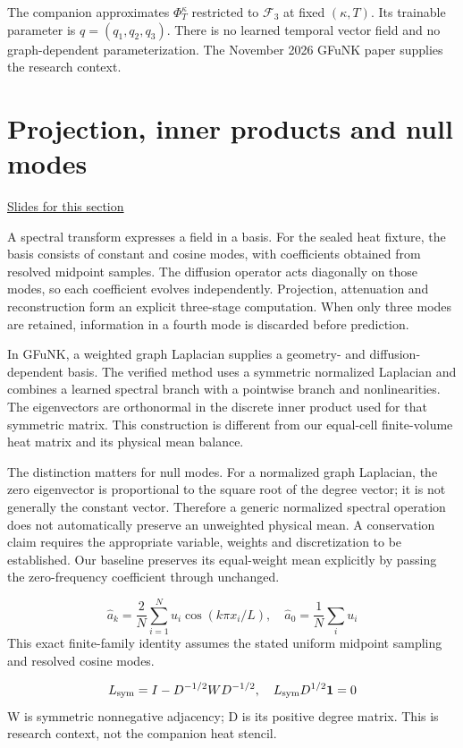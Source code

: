 \documentclass[11pt,letterpaper]{article}
\theoremstyle{definition}\newtheorem{definition}{Definition}\newtheorem{example}{Example}
\numberwithin{equation}{section}
\begin{document}
The companion approximates $\Phi_T^\kappa$ restricted to $\mathcal F_3$ at fixed $(\kappa,T)$. Its trainable parameter is $q=(q_1,q_2,q_3)$. There is no learned temporal vector field and no graph-dependent parameterization. The November 2026 GFuNK paper supplies the research context.
\section{Projection, inner products and null modes}
\hypertarget{note-projection-inner-products-and-null-modes}{}\label{note:projection-inner-products-and-null-modes}
{\small \href{slides.html\#frame=resolved-midpoint-projection\&step=1}{Slides for this section}}\par
A spectral transform expresses a field in a basis. For the sealed heat fixture, the basis consists of constant and cosine modes, with coefficients obtained from resolved midpoint samples. The diffusion operator acts diagonally on those modes, so each coefficient evolves independently. Projection, attenuation and reconstruction form an explicit three-stage computation. When only three modes are retained, information in a fourth mode is discarded before prediction.

In GFuNK, a weighted graph Laplacian supplies a geometry- and diffusion-dependent basis. The verified method uses a symmetric normalized Laplacian and combines a learned spectral branch with a pointwise branch and nonlinearities. The eigenvectors are orthonormal in the discrete inner product used for that symmetric matrix. This construction is different from our equal-cell finite-volume heat matrix and its physical mean balance.

The distinction matters for null modes. For a normalized graph Laplacian, the zero eigenvector is proportional to the square root of the degree vector; it is not generally the constant vector. Therefore a generic normalized spectral operation does not automatically preserve an unweighted physical mean. A conservation claim requires the appropriate variable, weights and discretization to be established. Our baseline preserves its equal-weight mean explicitly by passing the zero-frequency coefficient through unchanged.

\[
\hat a_k=\frac{2}{N}\sum_{i=1}^N u_i\cos(k\pi x_i/L),\quad\hat a_0=\frac1N\sum_i u_i
\]
This exact finite-family identity assumes the stated uniform midpoint sampling and resolved cosine modes.

\[
L_{\rm sym}=I-D^{-1/2}WD^{-1/2},\quad L_{\rm sym}D^{1/2}\mathbf1=0
\]
W is symmetric nonnegative adjacency; D is its positive degree matrix. This is research context, not the companion heat stencil.
\end{document}
